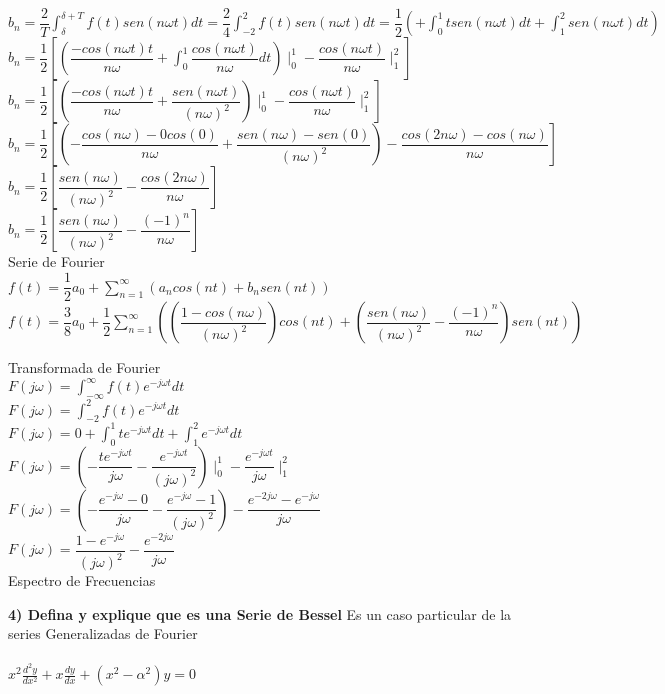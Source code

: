 \documentclass[10pt,a4paper]{article}
\begin{document}
\begin{center}
$\displaystyle{b_n = \dfrac{2}{T} \int_{\delta}^{\delta + T} f(t) sen (n \omega t)dt = \dfrac{2}{4} \int_{-2}^{2} f(t) sen (n \omega t)dt = \dfrac{1}{2} ( + \int_{0}^{1} t sen (n \omega t) dt + \int_{1}^{2} sen (n \omega t) dt)}$\\
$\displaystyle{b_n = \dfrac{1}{2} [(\dfrac{- cos(n \omega t) t}{n \omega} + \int_{0}^{1} \dfrac{cos(n \omega t)}{n \omega} dt)  \mid_{0}^{1}  - \dfrac{cos(n \omega t) }{n \omega} \mid_{1}^{2}]}$\\
$\displaystyle{b_n = \dfrac{1}{2} [(\dfrac{- cos(n \omega t) t}{n \omega} + \dfrac{sen(n \omega t)}{(n \omega)^2})  \mid_{0}^{1}  - \dfrac{cos(n \omega t) }{n \omega} \mid_{1}^{2}]}$\\
$\displaystyle{b_n = \dfrac{1}{2} [(-\dfrac{cos(n \omega ) - 0cos(0)}{n \omega} + \dfrac{sen(n \omega)- sen(0)}{(n \omega)^2}) - \dfrac{cos(2 n \omega)- cos(n \omega) }{n \omega}]}$\\
$\displaystyle{b_n = \dfrac{1}{2} [\dfrac{sen(n \omega)}{(n \omega)^2}  - \dfrac{cos(2 n \omega)}{n \omega}]}$\\
$\displaystyle{b_n = \dfrac{1}{2} [\dfrac{sen(n \omega)}{(n \omega)^2}  - \dfrac{(-1)^n}{n \omega}]}$\\
Serie de Fourier \\
$\displaystyle{f(t) = \dfrac{1}{2} a_0 + \sum_{n = 1}^{\infty} (a_n cos(nt) + b_n sen(nt))}$\\
$\displaystyle{f(t) = \dfrac{3}{8} a_0 + \dfrac{1}{2} \sum_{n = 1}^{\infty}( (\dfrac{1 - cos(n \omega)}{(n \omega)^2}) cos(nt) + (\dfrac{sen(n \omega)}{(n \omega)^2}  - \dfrac{(-1)^n}{n \omega}) sen(nt))}$\\
\end{center}

\begin{center}
Transformada de Fourier\\
$\displaystyle{F(j \omega) = \int_{-\infty}^{\infty} f(t) e^{-j \omega t} dt}$\\
$\displaystyle{F(j \omega) = \int_{-2}^{2} f(t) e^{-j \omega t} dt}$\\
$\displaystyle{F(j \omega) = 0 + \int_{0}^{1} t e^{-j \omega t} dt + \int_{1}^{2} e^{-j \omega t} dt}$\\
$\displaystyle{F(j \omega) =(-\dfrac{ t e^{-j \omega t}}{j \omega} - \dfrac{e^{-j \omega t}}{(j \omega)^2}) \mid_{0}^ {1} - \dfrac{ e^{-j \omega t}}{j \omega} \mid_{1}^{2}}$\\
$\displaystyle{F(j \omega) =(-\dfrac{e^{-j \omega }-0}{j \omega} - \dfrac{e^{-j \omega} - 1}{(j \omega)^2}) - \dfrac{ e^{-2j \omega }- e^{-j \omega }}{j \omega} }$\\
$\displaystyle{F(j \omega) =  \dfrac{1-e^{-j \omega}}{(j \omega)^2}  - \dfrac{ e^{-2j \omega }}{j \omega}}$\\
Espectro de Frecuencias

\end{center}
\textbf{4) Defina y explique que es una Serie de Bessel}
Es un caso particular de la series Generalizadas de Fourier\\
\\${x^2 \frac{d^2 y}{dx^2} + x \frac{dy}{dx} + (x^2 - \alpha^2)y = 0}$
\end{document}
